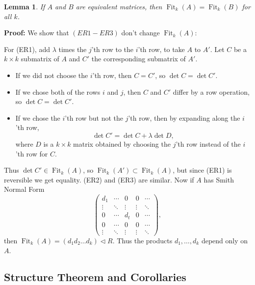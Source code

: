 \documentclass[12pt]{article}
\DeclareMathOperator{\Fit}{Fit}
\newtheorem{lemma}{Lemma}[section]
\theoremstyle{definition}
\theoremstyle{remark}
\begin{document}
\begin{lemma}
	If $A$ and $B$ are equivalent matrices, then $\Fit_{k}(A) = \Fit_{k}(B)$ for all $k$.
\end{lemma}
\begin{adjustbox}{minipage = \columnwidth - 25.5pt, margin=1em, frame=1pt, margin=0em}
	\textbf{Proof:} We show that $(ER1 - ER3)$ don't change $\Fit_{k}(A)$:

	For (ER1), add $\lambda$ times the $j$'th row to the $i$'th row, to take $A$ to $A'$. Let $C$ be a $k \times k$ submatrix of $A$ and $C'$ the corresponding submatrix of $A'$.
			\begin{itemize}
				\item If we did not choose the $i$'th row, then $C = C'$, so $\det C = \det C'$.
				\item If we chose both of the rows $i$ and $j$, then $C$ and $C'$ differ by a row operation, so $\det C = \det C'$.
				\item If we chose the $i$'th row but not the $j$'th row, then by expanding along the $i$'th row,
					\[
					\det C' = \det C + \lambda \det D
					,\]
					where $D$ is a $k \times k$ matrix obtained by choosing the $j$'th row instead of the $i$'th row for $C$.
			\end{itemize}
\end{adjustbox}

\begin{adjustbox}{minipage = \columnwidth - 25.5pt, margin=1em, frame=1pt, margin=0em}
 Thus $\det C' \in \Fit_{k}(A)$, so $\Fit_{k}(A') \subset \Fit_{k}(A)$, but since (ER1) is reversible we get equality. (ER2) and (ER3) are similar. Now if $A$ has Smith Normal Form
\[
	\begin{pmatrix}
		d_1 & \cdots & 0 & 0 & \cdots \\
		\vdots & \ddots & \vdots & \vdots & \ddots \\
		0 & \cdots & d_t & 0 & \cdots \\
		0 & \cdots & 0 & 0 & \cdots \\
		\vdots & \ddots & \vdots & \vdots & \ddots
	\end{pmatrix}
	,\]
	then $\Fit_{k}(A) = (d_1 d_2 \ldots d_k) \lhd R$. Thus the products $d_1, \ldots, d_k$ depend only on $A$.
\end{adjustbox}

\subsection{Structure Theorem and Corollaries}%
\label{sub:structure_theorem_and_corollaries}
\end{document}

